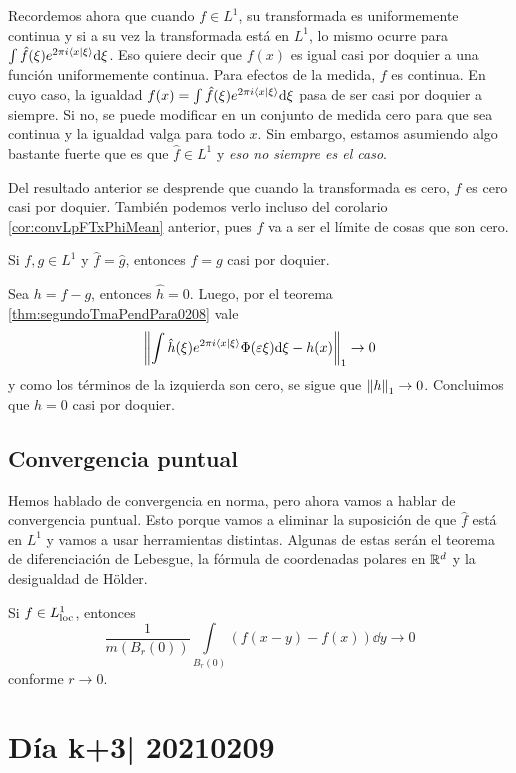 \documentclass[12pt]{memoir}
\begin{document}
Recordemos ahora que cuando $f\in L^1$, su transformada es uniformemente continua y si a su vez la transformada está en $L^1$, lo mismo ocurre para $\int\hat f(\xi)e^{2\pi i\braket{x}{\xi}}\dd \xi$. Eso quiere decir que $f(x)$ es igual casi por doquier a una función uniformemente continua. Para efectos de la medida, $f$ es continua. En cuyo caso, la igualdad $f(x)=\int\hat f(\xi)e^{2\pi i\braket{x}{\xi}}\dd \xi$ pasa de ser casi por doquier a siempre. Si no, se puede modificar en un conjunto de medida cero para que sea continua y la igualdad valga para todo $x$. Sin embargo, estamos asumiendo algo bastante fuerte que es que $\hat{f}\in L^1$ y \emph{eso no siempre es el caso}.\par 
Del resultado anterior se desprende que cuando la transformada es cero, $f$ es cero casi por doquier. También podemos verlo incluso del corolario \ref{cor:convLpFTxPhiMean} anterior, pues $f$ va a ser el límite de cosas que son cero.

\begin{Cor}
  Si $f,g\in L^1$ y $\hat{f}=\hat{g}$, entonces $f=g$ casi por doquier. 
\end{Cor}

\begin{ptcbp}
  Sea $h=f-g$, entonces $\hat{h}=0$. Luego, por el teorema \ref{thm:segundoTmaPendPara0208} vale
  $$\left\|\int\hat{h}(\xi)e^{2\pi i\braket{x}{\xi}}\Phi(\varepsilon\xi)\dd\xi-h(x)\right\|_1\to0$$
  y como los términos de la izquierda son cero, se sigue que $\left\|h\right\|_1\to0$. Concluimos que $h=0$ casi por doquier.
\end{ptcbp}

\subsection{Convergencia puntual}

Hemos hablado de convergencia en norma, pero ahora vamos a hablar de convergencia puntual. Esto porque vamos a eliminar la suposición de que $\hat{f}$ está en $L^1$ y vamos a usar herramientas distintas. Algunas de estas serán el teorema de diferenciación de Lebesgue, la fórmula de coordenadas polares en $\mathbb{R}^d$ y la desigualdad de Hölder. 

\begin{Th}\label{thm:}
  Si $f\in L^1_{\text{loc}}$, entonces
  $$\frac{1}{m(B_r(0))}\int\limits_{B_r(0)}(f(x-y)-f(x))\dd y\to 0$$
  conforme $r\to 0$.
\end{Th}
\section{Día k+3| 20210209}
\end{document}
